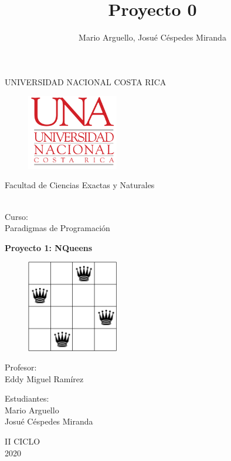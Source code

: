 \documentclass[12pt,a4paper]{article}
\author{Mario Arguello, Josué Céspedes Miranda}
\title{Proyecto 0}
\begin{document}
\begin{titlepage}
\begin{center}
\begin{large}
UNIVERSIDAD NACIONAL COSTA RICA \\
\begin{figure}[htp]
\centering
\includegraphics[width=4cm]{imagenes/240px-UNA.png} 
\label{foto}
\end{figure}
\end{large}
\begin{large}
Facultad de Ciencias Exactas y Naturales
\end{large} 
\begin{large}
\vspace*{1cm}\\
Curso:\\
\vspace*{2mm}
Paradigmas de Programación\\
\end{large}
\vspace*{8mm}
\begin{large}
\textbf{Proyecto 1: 
NQueens
}\\
\end{large}
\begin{figure}[htp]
\centering
\includegraphics[width=4cm]{imagenes/queens.png} 
\end{figure}
\begin{large}
\vspace*{1cm}
Profesor:\\
\vspace*{5mm}
Eddy Miguel Ramírez\\
\end{large}
\begin{large}
\vspace*{1cm}
Estudiantes: \\
\vspace*{5mm}
Mario Arguello \\
Josué Céspedes Miranda \\
\end{large}
\vspace*{1cm}
II CICLO\\
\vspace*{1cm}
2020
\end{center}
\end{titlepage}
\tableofcontents
\pagebreak
\end{document}
